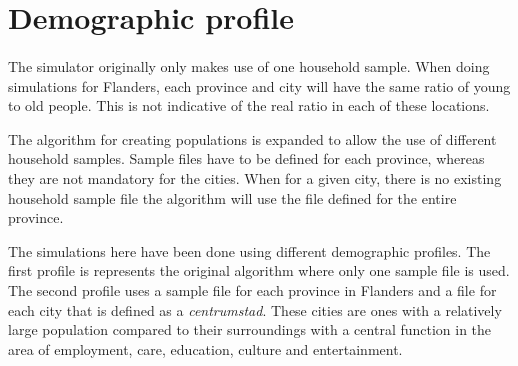 \documentclass[runningheads]{llncs}
\begin{document}
\section{Demographic profile}
\paragraph{}
The simulator originally only makes use of one household sample. When doing simulations for Flanders, each province and city will have the same ratio of young to old people. This is not indicative of the real ratio in each of these locations.

The algorithm for creating populations is expanded to allow the use of different household samples. Sample files have to be defined for each province, whereas they are not mandatory for the cities. When for a given city, there is no existing household sample file the algorithm will use the file defined for the entire province.

The simulations here have been done using different demographic profiles. The first profile is represents the original algorithm where only one sample file is used. The second profile uses a sample file for each province in Flanders and a file for each city that is defined as a \emph{centrumstad}.
These cities are ones with a relatively large population compared to their surroundings with a central function in the area of employment, care, education, culture and entertainment.
\end{document}
